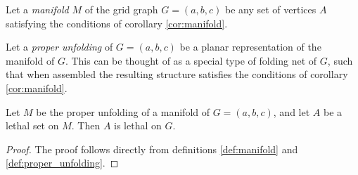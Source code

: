 \begin{defn}
\label{def:manifold}
Let a \emph{manifold} $M$ of the grid graph $G = (a,b,c)$ be any set of vertices $A$ satisfying the conditions of corollary \ref{cor:manifold}.
\end{defn}

\begin{defn}
\label{def:proper_unfolding}
Let a \emph{proper unfolding} of $G = (a,b,c)$ be a planar representation of the manifold of $G$. This can be thought of as a special type of folding net of $G$, such that when assembled the resulting structure satisfies the conditions of corollary \ref{cor:manifold}.
\end{defn}

\begin{cor}
\label{cor:ortho_walls}
Let $M$ be the proper unfolding of a manifold of $G = (a,b,c)$, and let $A$ be a lethal set on $M$. Then $A$ is lethal on $G$.
\end{cor}

\begin{proof}
The proof follows directly from definitions \ref{def:manifold} and \ref{def:proper_unfolding}.
\end{proof}





